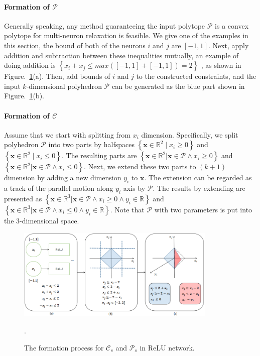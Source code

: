 \documentclass[runningheads]{llncs}
\newcommand{\myvec}[1]{\boldsymbol{#1}}
\newcommand{\relu}{ReLU\xspace}
\begin{document}
\paragraph{Formation of $\mathcal{P}$}
Generally speaking, any method guaranteeing the input polytope $\mathcal{P}$ is a convex polytope for multi-neuron relaxation is feasible. We give one of the examples in this section, the bound of both of the neurons $i$ and $j$ are $[-1,1]$. Next, apply addition and subtraction between these inequalities mutually, an example of doing addition is $\left\{x_{i} + x_{j} \leq max([-1,1]+[-1,1])=2 \right\}$ , as shown in Figure.~\ref{process_c}(a). Then, add bounds of $i$ and $j$ to the constructed constraints, and the input $k$-dimensional polyhedron $\mathcal{P}$ can be generated as the blue part shown in Figure.~\ref{process_c}(b).
%
%
%
\paragraph{Formation of $\mathcal{C}$} 
Assume that we start with splitting from $x_{i}$ dimension. Specifically, we split polyhedron $\mathcal{P}$ into two parts by halfspaces $\left \{\myvec{x} \in \mathbb{R}^{2} \mid x_{i} \geq 0 \right \}$ and $\left \{\myvec{x} \in \mathbb{R}^{2} \mid x_{i} \leq 0 \right \}$.
The resulting parts are $\left\{ \myvec{x} \in \mathbb{R}^{2} | \myvec{x} \in \mathcal{P} \wedge x_{i} \geq 0 \right\}$
and $\left\{ \myvec{x} \in \mathbb{R}^{2} | \myvec{x} \in \mathcal{P} \wedge x_{i} \leq 0 \right\}$.
Next, we extend these two parts to $(k+1)$ dimension by adding a new dimension $y_{i}$ to $\myvec{x}$. The extension can be regarded as a track of the parallel motion along $y_{i}$ axis by $\mathcal{P}$. The results by extending are presented as $\left\{ \myvec{x} \in \mathbb{R}^{3} | \myvec{x} \in \mathcal{P} \wedge x_{i} \geq 0 \wedge y_{i}\in \mathbb{R} \right\}$ and $\left\{ \myvec{x} \in \mathbb{R}^{3} | \myvec{x} \in \mathcal{P} \wedge x_{i} \leq 0\wedge y_{i}\in \mathbb{R} \right\}$. Note that $\mathcal{P}$ with two parameters is put into the 3-dimensional space.
\begin{figure}
\vskip 0.01in 
\begin{center}
\includegraphics[width=0.85\textwidth]{figures/process_c.png}
\caption{The formation process for $\mathcal{C}_{s}$ and $\mathcal{P}_{s}$ in \relu network.}. \label{process_c}
\end{center}
\vskip -0.01in
\end{figure}
\end{document}
